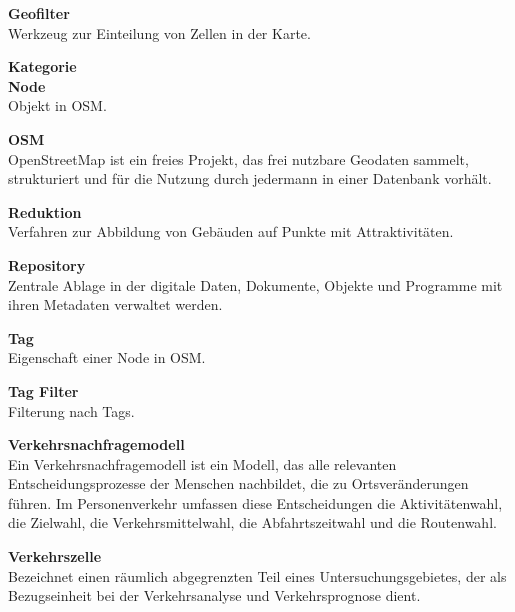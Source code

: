 \documentclass[parskip=full]{scrartcl} %
\begin{document}
\textbf{Geofilter}\\
Werkzeug zur Einteilung von Zellen in der Karte.

\textbf{Kategorie}\\


\textbf{Node}\\
Objekt in OSM.

\textbf{OSM}\\
OpenStreetMap ist ein freies Projekt, das frei nutzbare Geodaten sammelt, strukturiert und für die Nutzung durch jedermann in einer Datenbank vorhält.

\textbf{Reduktion}\\
Verfahren zur Abbildung von Gebäuden auf Punkte mit Attraktivitäten.

\textbf{Repository}\\
Zentrale Ablage in der digitale Daten, Dokumente, Objekte und Programme mit ihren Metadaten verwaltet werden.

\textbf{Tag}\\
Eigenschaft einer Node in OSM.

\textbf{Tag Filter}\\
Filterung nach Tags.

\textbf{Verkehrsnachfragemodell}\\
Ein Verkehrsnachfragemodell ist ein Modell, das alle relevanten Entscheidungsprozesse der Menschen nachbildet, die zu Ortsveränderungen führen. Im Personenverkehr umfassen diese Entscheidungen die Aktivitätenwahl, die Zielwahl, die Verkehrsmittelwahl, die Abfahrtszeitwahl und die Routenwahl.

\textbf{Verkehrszelle}\\
Bezeichnet einen räumlich abgegrenzten Teil eines Untersuchungsgebietes, der als Bezugseinheit bei der Verkehrsanalyse und Verkehrsprognose dient.
\end{document}
